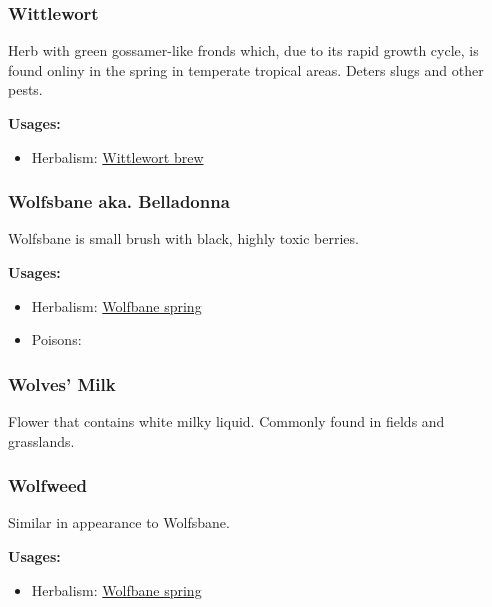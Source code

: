 \subsubsection{Wittlewort}
\label{Wittlewort}

Herb with green gossamer-like fronds which, due to its rapid growth cycle, is found onliny in the spring in temperate tropical areas. Deters slugs and other pests.

\vspace{5mm}

\textbf{Usages:}

\begin{itemize}[noitemsep]
\item[] Herbalism: \hyperref[Wittlewort brew]{Wittlewort brew}
\end{itemize}

\subsubsection{Wolfsbane aka. Belladonna}
\label{Wolfsbane}

Wolfsbane is small brush with black, highly toxic berries.

\vspace{5mm}

\textbf{Usages:}

\begin{itemize}[noitemsep]
\item[] Herbalism: \hyperref[Wolfbane spring]{Wolfbane spring}
\item[] Poisons: \poison\poison
\end{itemize}

\subsubsection{Wolves' Milk}

Flower that contains white milky liquid. Commonly found in fields and grasslands.

\subsubsection{Wolfweed}
\label{Wolfweed}

Similar in appearance to Wolfsbane.

\vspace{5mm}

\textbf{Usages:}

\begin{itemize}[noitemsep]
\item[] Herbalism: \hyperref[Wolfbane spring]{Wolfbane spring}
\end{itemize}

